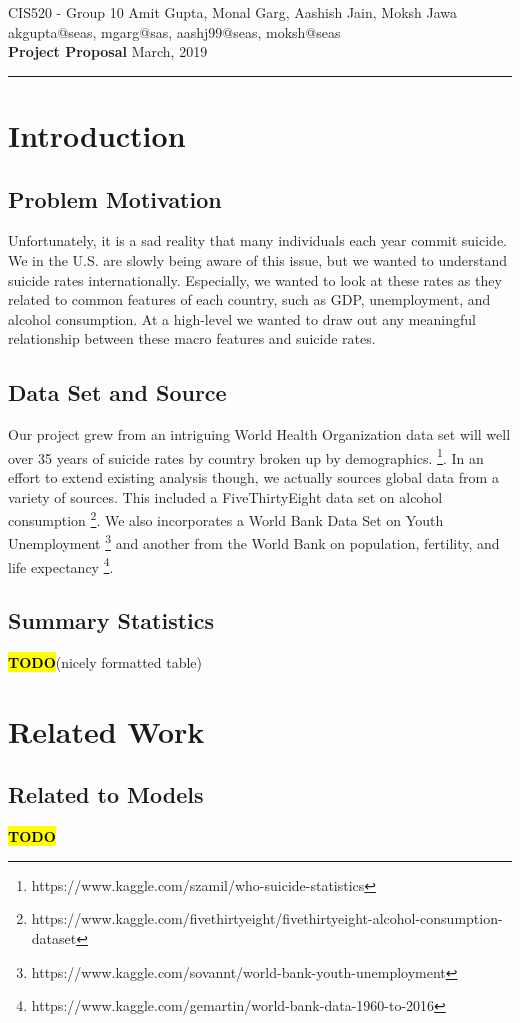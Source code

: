 \documentclass{article}
\makeatletter
\newcommand{\MyName}{Amit Gupta, Monal Garg, Aashish Jain, Moksh Jawa}
\newcommand{\MyPennKey}{akgupta@seas, mgarg@sas, aashj99@seas, moksh@seas}
\newcommand{\Class}{CIS520}
\newcommand{\TODO}{\textcolor{red}{\textbf{\hl{TODO}}}}
\newcommand{\PrintFirstHeader}{
  \Large{\Class} - \large{Group 10} \hfill {\Large{\MyName}}
  \\
   \vspace{5pt} \hfill \normalsize{\MyPennKey}
  \\
  {\LARGE{\textbf{Project Proposal}}}  \hfill {\Large{March, 2019}}

  \rule{\textwidth}{0.4pt}}
\makeatother
\begin{document}
\thispagestyle{firstpage}
\PrintFirstHeader{}

\begin{multicols}{2}

\section{Introduction}
\subsection{Problem Motivation} Unfortunately, it is a sad reality that many individuals each year commit suicide. We in the U.S. are slowly being aware of this issue, but we wanted to understand suicide rates internationally. Especially, we wanted to look at these rates as they related to common features of each country, such as GDP, unemployment, and alcohol consumption. At a high-level we wanted to draw out any meaningful relationship between these macro features and suicide rates.
\subsection{Data Set and Source} Our project grew from an intriguing 
World Health Organization data set will well over 35 years of suicide rates by country broken up by demographics.  \footnote{https://www.kaggle.com/szamil/who-suicide-statistics}. In an effort to extend existing analysis though, we actually sources global data from a variety of sources. This included a FiveThirtyEight data set on alcohol consumption \footnote{https://www.kaggle.com/fivethirtyeight/fivethirtyeight-alcohol-consumption-dataset}. We also incorporates a World Bank Data Set on Youth Unemployment \footnote{https://www.kaggle.com/sovannt/world-bank-youth-unemployment} and another from the World Bank on population, fertility, and life expectancy \footnote{https://www.kaggle.com/gemartin/world-bank-data-1960-to-2016}.
\subsection{Summary Statistics} \TODO (nicely formatted table)


\section{Related Work}
\subsection{Related to Models} \TODO

\end{multicols}
\end{document}
